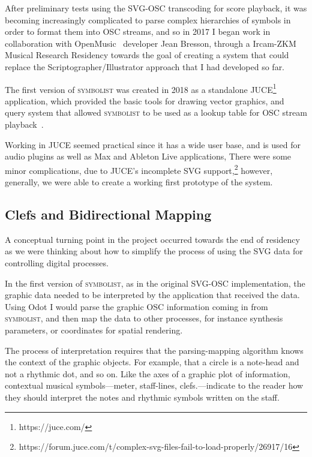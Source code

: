 \documentclass{article}
\def\symbolist{\textsc{symbolist}\xspace}
\begin{document}
After preliminary tests using the SVG-OSC transcoding for score playback, it was becoming increasingly complicated to parse complex hierarchies of symbols in order to format them into OSC streams, and so in 2017 I began work in collaboration with OpenMusic~\cite{bresson2011om} developer Jean Bresson, through a Ircam-ZKM Musical Research Residency towards the goal of creating a system that could replace the Scriptographer/Illustrator approach that I had developed so far.

The first version of \symbolist was created in 2018 as a standalone JUCE\footnote{https://juce.com/} application, which provided the basic tools for drawing vector graphics, and query system that allowed \symbolist to be used as a lookup table for OSC stream playback~\cite{gottfried2018symbolist}.

Working in JUCE seemed practical since it has a wide user base, and is used for audio plugins as well as Max and Ableton Live applications,
There were some minor complications, due to JUCE's incomplete SVG support,\footnote{https://forum.juce.com/t/complex-svg-files-fail-to-load-properly/26917/16} however, generally, we were able to create a working first prototype of the system.

\subsection*{Clefs and Bidirectional Mapping}\label{sec:bidirectional_mapping}

A conceptual turning point in the project occurred towards the end of residency as we were thinking about how to simplify the process of using the SVG data for controlling digital processes.

In the first version of \symbolist, as in the original SVG-OSC implementation, the graphic data needed to be interpreted by the application that received the data. 
Using Odot I would parse the graphic OSC information coming in from \symbolist, and then map the data to other processes, for instance synthesis parameters, or coordinates for spatial rendering. 

The process of interpretation requires that the parsing-mapping algorithm knows the context of the graphic objects. For example, that a circle is a note-head and not a rhythmic dot, and so on. 
Like the axes of a graphic plot of information, contextual musical symbols---meter, staff-lines, clefs.---indicate to the reader how they should interpret the notes and rhythmic symbols written on the staff.
\end{document}
